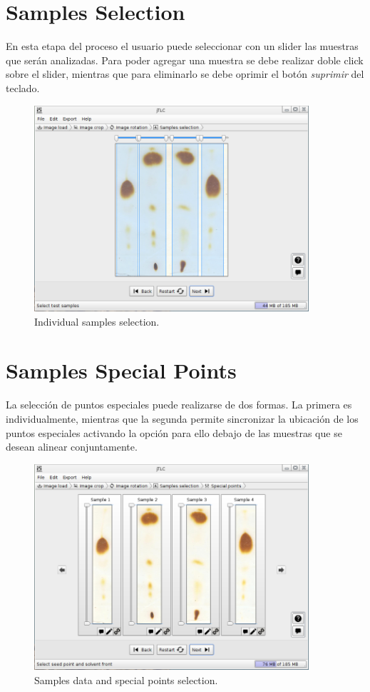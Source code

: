\section{Samples Selection}
En esta etapa del proceso el usuario puede seleccionar con un slider las muestras que ser\'an analizadas. Para poder agregar una muestra se debe realizar doble click sobre el slider, mientras que para eliminarlo se debe oprimir el bot\'on \emph{suprimir} del teclado.
\begin{figure}[H]
	\vspace{0cm}
	\centering
	\includegraphics[width=385px]{imagenes/selection}
	\centering
	\vspace{-0.4cm}
	\caption{Individual samples selection.}
	\label{fig:image_samples_selection}
	\vspace{-0.25cm}
\end{figure}

\section{Samples Special Points}
La selecci\'on de puntos especiales puede realizarse de dos formas. La primera es individualmente, mientras que la segunda permite sincronizar la ubicación de los puntos especiales activando la opción para ello debajo de las muestras que se desean alinear conjuntamente.
\begin{figure}[H]
	\vspace{0cm}
	\centering
	\includegraphics[width=385px]{imagenes/points}
	\centering
	\vspace{-0.4cm}
	\caption{Samples data and special points selection.}
	\label{fig:image_samples_special_points}
	\vspace{-0.25cm}
\end{figure}

